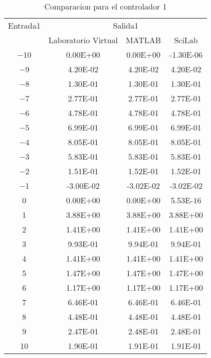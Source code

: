         {\setlength\LTleft{0pt}
        \setlength\LTright{0pt}
        \centering
        \renewcommand{\arraystretch}{0.89}
        \begin{longtable}{c @{\extracolsep{\fill}} ccc}
        \caption[Comparacion de diseño de controladores difusos - controlador 1]{Comparacion para el controlador 1} 
        \label{tab:C1Difuso} \\
        \toprule
        Entrada1  &        \multicolumn{3}{c}{Salida1}        \\ \cmidrule{1-1} \cmidrule{2-4}
                  &   Laboratorio Virtual  & MATLAB & SciLab  \\ \cmidrule{2-2} \cmidrule{3-3} \cmidrule{4-4}
        \endhead
        \num{-10} & \num{0.00E+00}  & \num{0.00E+00}  & \num{-1.30E-06}  \\
        \num{-9}  & \num{4.20E-02}  & \num{4.20E-02}  & \num{4.20E-02}   \\
        \num{-8}  & \num{1.30E-01}  & \num{1.30E-01}  & \num{1.30E-01}   \\
        \num{-7}  & \num{2.77E-01}  & \num{2.77E-01}  & \num{2.77E-01}   \\
        \num{-6}  & \num{4.78E-01}  & \num{4.78E-01}  & \num{4.78E-01}   \\
        \num{-5}  & \num{6.99E-01}  & \num{6.99E-01}  & \num{6.99E-01}   \\
        \num{-4}  & \num{8.05E-01}  & \num{8.05E-01}  & \num{8.05E-01}   \\
        \num{-3}  & \num{5.83E-01}  & \num{5.83E-01}  & \num{5.83E-01}   \\
        \num{-2}  & \num{1.51E-01}  & \num{1.52E-01}  & \num{1.52E-01}   \\
        \num{-1}  & \num{-3.00E-02} & \num{-3.02E-02} & \num{-3.02E-02}  \\
        \num{0}   & \num{0.00E+00}  & \num{0.00E+00}  & \num{5.53E-16}   \\
        \num{1}   & \num{3.88E+00}  & \num{3.88E+00}  & \num{3.88E+00}   \\
        \num{2}   & \num{1.41E+00}  & \num{1.41E+00}  & \num{1.41E+00}   \\
        \num{3}   & \num{9.93E-01}  & \num{9.94E-01}  & \num{9.94E-01}   \\
        \num{4}   & \num{1.41E+00}  & \num{1.41E+00}  & \num{1.41E+00}   \\
        \num{5}   & \num{1.47E+00}  & \num{1.47E+00}  & \num{1.47E+00}   \\
        \num{6}   & \num{1.17E+00}  & \num{1.17E+00}  & \num{1.17E+00}   \\
        \num{7}   & \num{6.46E-01}  & \num{6.46E-01}  & \num{6.46E-01}   \\
        \num{8}   & \num{4.48E-01}  & \num{4.48E-01}  & \num{4.48E-01}   \\
        \num{9}   & \num{2.47E-01}  & \num{2.48E-01}  & \num{2.48E-01}   \\
        \num{10}  & \num{1.90E-01}  & \num{1.91E-01}  & \num{1.91E-01}   \\
        \bottomrule
        \end{longtable}}

